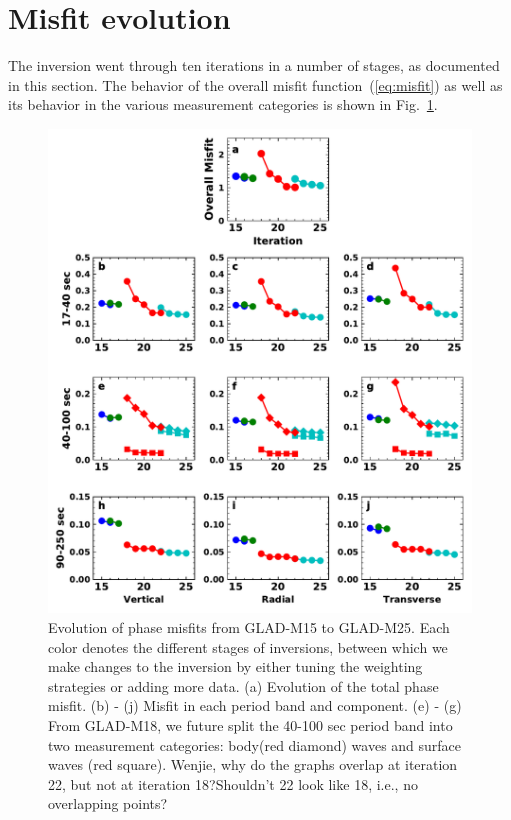 \documentclass[extra,mreferee]{gji}
\begin{document}
\section{Misfit evolution}

The inversion went through ten iterations in a number of stages, as documented in this section.
The behavior of the overall misfit function~(\ref{eq:misfit}) as well as its behavior in the various measurement categories is shown in Fig.~\ref{fig:misfit}.

\begin{figure}
  \centering
  \includegraphics[width=\textwidth]{figures/misfit.pdf}
  \caption{Evolution of phase misfits from GLAD-M15 to GLAD-M25.
  Each color denotes the different stages of inversions, between
  which we make changes to the inversion by either tuning the
  weighting strategies or adding more data.
  (a) Evolution of the total phase misfit. (b) - (j) Misfit in
  each period band and component. (e) - (g) From GLAD-M18,
  we future split the 40-100 sec period band into two
  measurement categories: body(red diamond) waves and surface waves
  (red square).
  {\color{red} Wenjie, why do the graphs overlap at iteration 22, but not at iteration 18?Shouldn't 22 look like 18, i.e., no overlapping points?}
  }
  \label{fig:misfit}
\end{figure}
\end{document}
